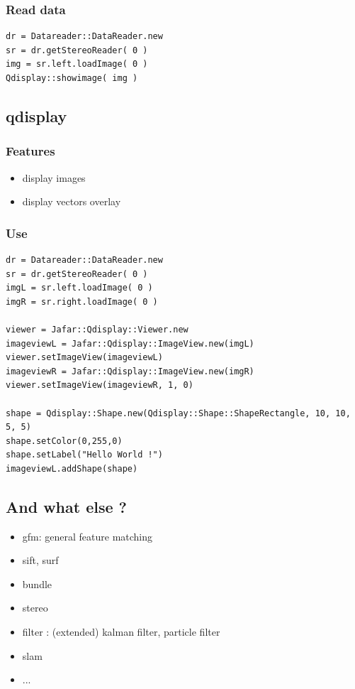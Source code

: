 \documentclass[compress]{beamer}
\begin{document}
\begin{frame}[fragile]
  \frametitle{Read data}
  \begin{lstlisting}
dr = Datareader::DataReader.new
sr = dr.getStereoReader( 0 )
img = sr.left.loadImage( 0 )
Qdisplay::showimage( img )
  \end{lstlisting}
\end{frame}


\subsection{qdisplay}
\begin{frame}
  \frametitle{Features}
  \begin{itemize}
   \item<1-> display images
   \item<2-> display vectors overlay 
  \end{itemize}
\end{frame}

\begin{frame}[fragile]
  \frametitle{Use}
  \begin{lstlisting}
dr = Datareader::DataReader.new
sr = dr.getStereoReader( 0 )
imgL = sr.left.loadImage( 0 )
imgR = sr.right.loadImage( 0 )

viewer = Jafar::Qdisplay::Viewer.new
imageviewL = Jafar::Qdisplay::ImageView.new(imgL)
viewer.setImageView(imageviewL)
imageviewR = Jafar::Qdisplay::ImageView.new(imgR)
viewer.setImageView(imageviewR, 1, 0)

shape = Qdisplay::Shape.new(Qdisplay::Shape::ShapeRectangle, 10, 10, 5, 5)
shape.setColor(0,255,0)
shape.setLabel("Hello World !")
imageviewL.addShape(shape)
  \end{lstlisting}

\end{frame}


\subsection{And what else ?}
\begin{frame}
  \begin{itemize}
   \item gfm: general feature matching
   \item sift, surf
   \item bundle
   \item stereo
   \item filter : (extended) kalman filter, particle filter
   \item slam
   \item ...
  \end{itemize}

\end{frame}
\end{document}
